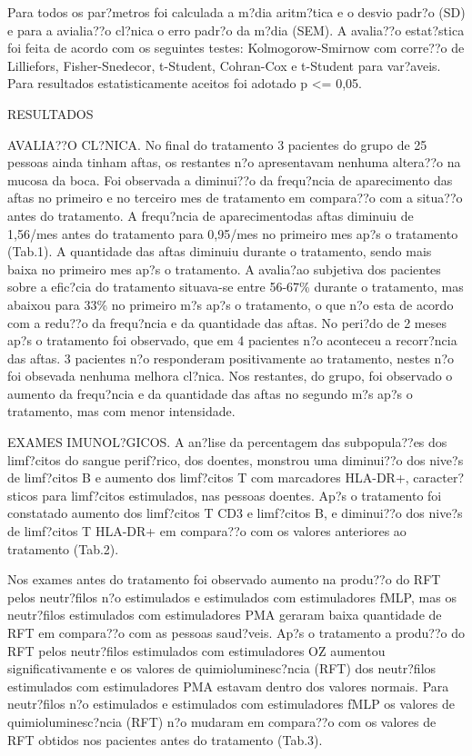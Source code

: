 \documentclass[12pt]{article}
\begin{document}
Para todos os par?metros foi calculada a m?dia aritm?tica e o desvio padr?o
(SD) e para a avialia??o cl?nica o erro padr?o da m?dia (SEM). A avalia??o
estat?stica foi feita de acordo com os seguintes testes: Kolmogorow-Smirnow com
corre??o de Lilliefors, Fisher-Snedecor,  t-Student, Cohran-Cox e t-Student
para var?aveis. Para resultados estatisticamente aceitos foi adotado p <= 0,05.

\begin{center}
\large{RESULTADOS}
\end{center}

 AVALIA??O CL?NICA.  No final do tratamento 3 pacientes do grupo de 25 pessoas
ainda tinham aftas, os restantes n?o apresentavam nenhuma altera??o na mucosa
da boca. Foi observada a diminui??o da frequ?ncia de aparecimento das aftas no
primeiro e no terceiro mes de tratamento em compara??o com a situa??o antes do
tratamento.  A frequ?ncia de aparecimentodas aftas diminuiu de 1,56/mes antes
do tratamento para 0,95/mes no primeiro mes ap?s o tratamento (Tab.1).  A
quantidade das aftas diminuiu durante o tratamento, sendo mais baixa no
primeiro mes ap?s o tratamento. A avalia?ao subjetiva dos pacientes sobre a
efic?cia do tratamento situava-se entre 56-67\% durante o tratamento, mas
abaixou para 33\% no primeiro m?s ap?s o tratamento, o que n?o esta de acordo
com  a redu??o da frequ?ncia e da quantidade das aftas. No peri?do de 2 meses
ap?s o tratamento foi observado, que em 4 pacientes n?o aconteceu a recorr?ncia
das aftas. 3 pacientes n?o responderam positivamente ao tratamento, nestes n?o
foi obsevada nenhuma melhora cl?nica. Nos restantes, do grupo, foi observado o
aumento da frequ?ncia e da quantidade das aftas no segundo m?s ap?s o
tratamento, mas com menor intensidade.

 EXAMES IMUNOL?GICOS. A an?lise da percentagem das subpopula??es dos limf?citos
do sangue perif?rico, dos doentes,  monstrou uma diminui??o dos nive?s de
limf?citos B e aumento dos limf?citos T com marcadores HLA-DR+, caracter?sticos
para limf?citos estimulados,  nas pessoas doentes. Ap?s o tratamento foi
constatado aumento dos limf?citos T CD3 e limf?citos B, e diminui??o dos nive?s
de limf?citos T HLA-DR+ em compara??o com os valores anteriores ao tratamento
(Tab.2).

 Nos exames antes do tratamento foi observado aumento na produ??o do RFT pelos
neutr?filos n?o estimulados e estimulados com estimuladores fMLP, mas os
neutr?filos estimulados com estimuladores PMA geraram baixa quantidade de RFT
em compara??o com as pessoas saud?veis.  Ap?s o tratamento a produ??o do RFT
pelos neutr?filos estimulados com estimuladores OZ aumentou significativamente
e os valores de quimioluminesc?ncia (RFT) dos neutr?filos estimulados com
estimuladores PMA estavam dentro dos valores normais. Para neutr?filos n?o
estimulados e estimulados com estimuladores fMLP os valores de
quimioluminesc?ncia (RFT) n?o mudaram em compara??o com os valores de RFT
obtidos nos pacientes antes do tratamento (Tab.3).
\end{document}
